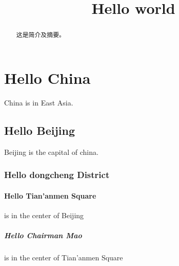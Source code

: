 \documentclass{ctexart}
\title{Hello world}
\begin{document}
\maketitle
\tableofcontents
\begin{abstract}
  这是简介及摘要。
\end{abstract}
\section{Hello China} China is in East Asia.
\subsection{Hello Beijing} Beijing is the capital of china.
\subsubsection{Hello dongcheng District}
\paragraph{Hello Tian'anmen Square}is in the center of Beijing
\subparagraph{Hello Chairman Mao} is in the center of Tian'anmen Square
\end{document}
